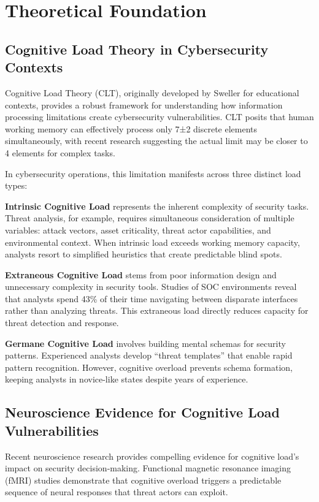 \documentclass[11pt,a4paper]{article}
\begin{document}
\section{Theoretical Foundation}

\subsection{Cognitive Load Theory in Cybersecurity Contexts}

Cognitive Load Theory (CLT), originally developed by Sweller\cite{sweller1988} for educational contexts, provides a robust framework for understanding how information processing limitations create cybersecurity vulnerabilities. CLT posits that human working memory can effectively process only 7±2 discrete elements simultaneously\cite{miller1956}, with recent research suggesting the actual limit may be closer to 4 elements for complex tasks\cite{cowan2001}.

In cybersecurity operations, this limitation manifests across three distinct load types:

\textbf{Intrinsic Cognitive Load} represents the inherent complexity of security tasks. Threat analysis, for example, requires simultaneous consideration of multiple variables: attack vectors, asset criticality, threat actor capabilities, and environmental context. When intrinsic load exceeds working memory capacity, analysts resort to simplified heuristics that create predictable blind spots.

\textbf{Extraneous Cognitive Load} stems from poor information design and unnecessary complexity in security tools. Studies of SOC environments reveal that analysts spend 43\% of their time navigating between disparate interfaces rather than analyzing threats\cite{cisco2023}. This extraneous load directly reduces capacity for threat detection and response.

\textbf{Germane Cognitive Load} involves building mental schemas for security patterns. Experienced analysts develop ``threat templates'' that enable rapid pattern recognition. However, cognitive overload prevents schema formation, keeping analysts in novice-like states despite years of experience.

\subsection{Neuroscience Evidence for Cognitive Load Vulnerabilities}

Recent neuroscience research provides compelling evidence for cognitive load's impact on security decision-making. Functional magnetic resonance imaging (fMRI) studies demonstrate that cognitive overload triggers a predictable sequence of neural responses that threat actors can exploit\cite{arnsten2009}.
\end{document}
